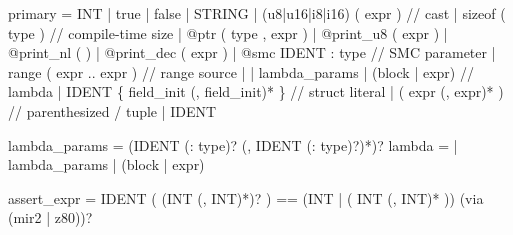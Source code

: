\documentclass[
  11pt,
]{article}
\newenvironment{Shaded}{}{}
\newcommand{\NormalTok}[1]{#1}
\begin{document}
\begin{Shaded}
\begin{Highlighting}[]
\NormalTok{primary        = INT | \textquotesingle{}true\textquotesingle{} | \textquotesingle{}false\textquotesingle{} | STRING}
\NormalTok{               | (\textquotesingle{}u8\textquotesingle{}|\textquotesingle{}u16\textquotesingle{}|\textquotesingle{}i8\textquotesingle{}|\textquotesingle{}i16\textquotesingle{}) \textquotesingle{}(\textquotesingle{} expr \textquotesingle{})\textquotesingle{}   // cast}
\NormalTok{               | \textquotesingle{}sizeof\textquotesingle{} \textquotesingle{}(\textquotesingle{} type \textquotesingle{})\textquotesingle{}                    // compile{-}time size}
\NormalTok{               | \textquotesingle{}@ptr\textquotesingle{} \textquotesingle{}(\textquotesingle{} type \textquotesingle{},\textquotesingle{} expr \textquotesingle{})\textquotesingle{}}
\NormalTok{               | \textquotesingle{}@print\_u8\textquotesingle{} \textquotesingle{}(\textquotesingle{} expr \textquotesingle{})\textquotesingle{} | \textquotesingle{}@print\_nl\textquotesingle{} \textquotesingle{}(\textquotesingle{} \textquotesingle{})\textquotesingle{} | \textquotesingle{}@print\_dec\textquotesingle{} \textquotesingle{}(\textquotesingle{} expr \textquotesingle{})\textquotesingle{}}
\NormalTok{               | \textquotesingle{}@smc\textquotesingle{} IDENT \textquotesingle{}:\textquotesingle{} type              // SMC parameter}
\NormalTok{               | \textquotesingle{}range\textquotesingle{} \textquotesingle{}(\textquotesingle{} expr \textquotesingle{}..\textquotesingle{} expr \textquotesingle{})\textquotesingle{}     // range source}
\NormalTok{               | \textquotesingle{}|\textquotesingle{} lambda\_params \textquotesingle{}|\textquotesingle{} (block | expr)    // lambda}
\NormalTok{               | IDENT \textquotesingle{}\{\textquotesingle{} field\_init (\textquotesingle{},\textquotesingle{} field\_init)* \textquotesingle{}\}\textquotesingle{}  // struct literal}
\NormalTok{               | \textquotesingle{}(\textquotesingle{} expr (\textquotesingle{},\textquotesingle{} expr)* \textquotesingle{})\textquotesingle{}           // parenthesized / tuple}
\NormalTok{               | IDENT}

\NormalTok{lambda\_params  = (IDENT (\textquotesingle{}:\textquotesingle{} type)? (\textquotesingle{},\textquotesingle{} IDENT (\textquotesingle{}:\textquotesingle{} type)?)*)?}
\NormalTok{lambda         = \textquotesingle{}|\textquotesingle{} lambda\_params \textquotesingle{}|\textquotesingle{} (block | expr)}

\NormalTok{assert\_expr    = IDENT \textquotesingle{}(\textquotesingle{} (INT (\textquotesingle{},\textquotesingle{} INT)*)? \textquotesingle{})\textquotesingle{} \textquotesingle{}==\textquotesingle{} (INT | \textquotesingle{}(\textquotesingle{} INT (\textquotesingle{},\textquotesingle{} INT)* \textquotesingle{})\textquotesingle{})}
\NormalTok{                 (\textquotesingle{}via\textquotesingle{} (\textquotesingle{}mir2\textquotesingle{} | \textquotesingle{}z80\textquotesingle{}))?}


\end{Highlighting}
\end{Shaded}
\end{document}
